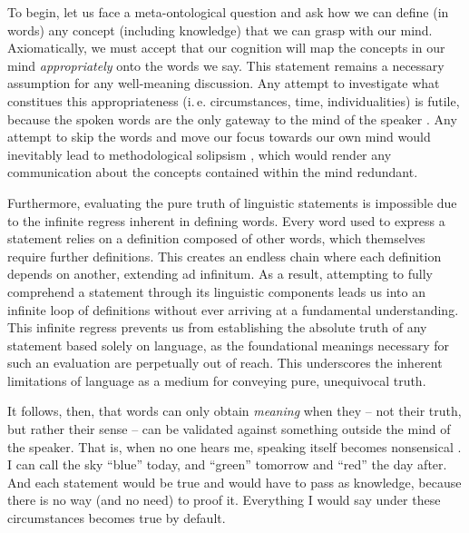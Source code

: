 To begin, let us face a meta-ontological question and ask how we can define (in words) any concept (including knowledge) that we can grasp with our mind.
Axiomatically, we must accept that our cognition will map the concepts in our mind \textit{appropriately} onto the words we say.
This statement remains a necessary assumption for any well-meaning discussion.
Any attempt to investigate what constitues this appropriateness (i.\,e. circumstances, time, individualities) is futile, because the spoken words are the only gateway to the mind of the speaker \parencite{wittgenstein-53}.
Any attempt to skip the words and move our focus towards our own mind would inevitably lead to methodological solipsism \parencite[136]{putnam-75}, which would render any communication about the concepts contained within the mind redundant.


Furthermore, evaluating the pure truth of linguistic statements is impossible due to the infinite regress inherent in defining words.
Every word used to express a statement relies on a definition composed of other words, which themselves require further definitions.
This creates an endless chain where each definition depends on another, extending ad infinitum.
As a result, attempting to fully comprehend a statement through its linguistic components leads us into an infinite loop of definitions without ever arriving at a fundamental understanding.
This infinite regress prevents us from establishing the absolute truth of any statement based solely on language, as the foundational meanings necessary for such an evaluation are perpetually out of reach.
This underscores the inherent limitations of language as a medium for conveying pure, unequivocal truth.

It follows, then, that words can only obtain \textit{meaning} when they -- not their truth, but rather their sense -- can be validated against something outside the mind of the speaker.
That is, when no one hears me, speaking itself becomes nonsensical \parencite{wittgenstein-33}.
I can call the sky \enquote{blue} today, and \enquote{green} tomorrow and \enquote{red} the day after.
And each statement would be true and would have to pass as knowledge, because there is no way (and no need) to proof it.
Everything I would say under these circumstances becomes true by default.

